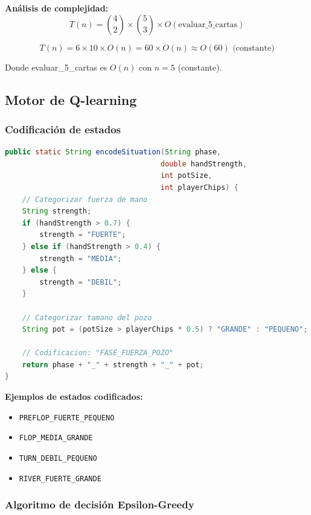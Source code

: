 \documentclass[12pt,a4paper]{article}
\begin{document}
\textbf{Análisis de complejidad:}
\begin{equation}
    T(n) = \binom{4}{2} \times \binom{5}{3} \times O(\text{evaluar\_5\_cartas})
\end{equation}

\begin{equation}
    T(n) = 6 \times 10 \times O(n) = 60 \times O(n) \approx O(60) \text{ (constante)}
\end{equation}

Donde evaluar\_5\_cartas es $O(n)$ con $n=5$ (constante).

\subsection{Motor de Q-learning}

\subsubsection{Codificación de estados}

\begin{lstlisting}[language=Java, caption=Codificación de estados mediante bucketing]
public static String encodeSituation(String phase, 
                                    double handStrength,
                                    int potSize, 
                                    int playerChips) {
    // Categorizar fuerza de mano
    String strength;
    if (handStrength > 0.7) {
        strength = "FUERTE";
    } else if (handStrength > 0.4) {
        strength = "MEDIA";
    } else {
        strength = "DEBIL";
    }
    
    // Categorizar tamano del pozo
    String pot = (potSize > playerChips * 0.5) ? "GRANDE" : "PEQUENO";
    
    // Codificacion: "FASE_FUERZA_POZO"
    return phase + "_" + strength + "_" + pot;
}
\end{lstlisting}

\textbf{Ejemplos de estados codificados:}
\begin{itemize}
    \item \texttt{PREFLOP\_FUERTE\_PEQUENO}
    \item \texttt{FLOP\_MEDIA\_GRANDE}
    \item \texttt{TURN\_DEBIL\_PEQUENO}
    \item \texttt{RIVER\_FUERTE\_GRANDE}
\end{itemize}

\subsubsection{Algoritmo de decisión Epsilon-Greedy}
\end{document}
